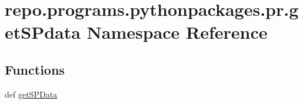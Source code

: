 \hypertarget{namespacerepo_1_1programs_1_1pythonpackages_1_1pr_1_1getSPdata}{\section{repo.\-programs.\-pythonpackages.\-pr.\-get\-S\-Pdata Namespace Reference}
\label{namespacerepo_1_1programs_1_1pythonpackages_1_1pr_1_1getSPdata}
}
\subsection*{Functions}
\begin{DoxyCompactItemize}
\item 
def \hyperlink{namespacerepo_1_1programs_1_1pythonpackages_1_1pr_1_1getSPdata_abf99dd1de2422300e6e0810c52e352b0}{get\-S\-P\-Data}
\end{DoxyCompactItemize}
